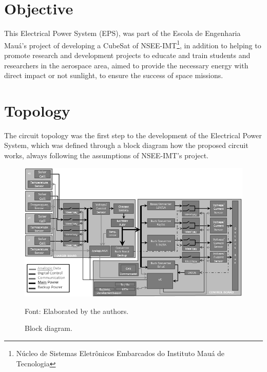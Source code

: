 \documentclass[3p]{elsarticle}
\begin{document}

\section{Objective}
\label{Objective}

	This Electrical Power System (EPS), was part of the Escola de Engenharia Mau\'{a}'s project of developing a CubeSat of NSEE-IMT\footnote{N\'{u}cleo de Sistemas Eletr\^{o}nicos Embarcados do Instituto Mau\'{a} de Tecnologia}, in addition to helping to promote research and development projects to educate and train students and researchers in the aerospace area, aimed to provide the necessary energy with direct impact or not sunlight, to ensure the success of space missions.
	
\section{Topology}
\label{Topologia}

	The circuit topology was the first step to the development of the Electrical Power System, which was defined through a block diagram how the proposed circuit works, always following the assumptions of NSEE-IMT's project.\cite{Corsi}

	\begin{figure}[th]
		\label{Fig_diag}
		\centering
		\includegraphics[width=0.8\linewidth]{./figs/diag}
		\caption{Block diagram.}
		\begin{footnotesize}
		Font: Elaborated by the authors.
		\end{footnotesize}
	\end{figure}
	
	
	
\end{document}
